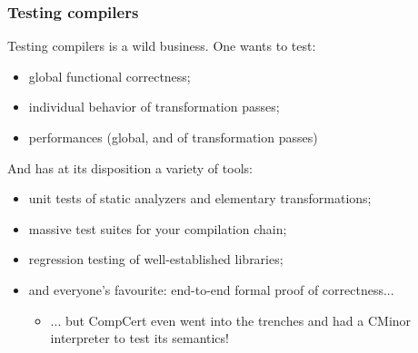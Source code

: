 \documentclass{beamer}
\begin{document}

\begin{frame}
  \frametitle{Testing compilers}

  Testing compilers is a wild business. One wants to test:

  \begin{itemize}
  \item global functional correctness;
  \item individual behavior of transformation passes;
  \item performances (global, and of transformation passes)
  \end{itemize}

  And has at its disposition a variety of tools:
  \begin{itemize}
  \item unit tests of static analyzers and elementary transformations;
  \item massive test suites for your compilation chain;
  \item regression testing of well-established libraries;
  \item and everyone's favourite: end-to-end formal proof of correctness...
    \begin{itemize}
    \item ... but CompCert even went into the trenches and had a
      CMinor interpreter to test its semantics!
    \end{itemize}
  \end{itemize}


\end{frame}
\end{document}
